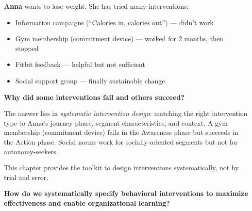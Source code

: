 \begin{tcolorbox}[colback=yellow!5!white, colframe=yellow!75!black,
    title=Intuition: Anna's Weight Loss Journey]

\textbf{Anna} wants to lose weight. She has tried many interventions:
\begin{itemize}[nosep]
\item Information campaigns (``Calories in, calories out'') --- didn't work
\item Gym membership (commitment device) --- worked for 2 months, then stopped
\item Fitbit feedback --- helpful but not sufficient
\item Social support group --- finally sustainable change
\end{itemize}

\textbf{Why did some interventions fail and others succeed?}

The answer lies in \textit{systematic intervention design}: matching the right intervention type to Anna's journey phase, segment characteristics, and context. A gym membership (commitment device) fails in the Awareness phase but succeeds in the Action phase. Social norms work for socially-oriented segments but not for autonomy-seekers.

This chapter provides the toolkit to design interventions systematically, not by trial and error.
\end{tcolorbox}


\begin{tcolorbox}[colback=red!5!white, colframe=red!75!black,
    title=Central Question]
\textbf{How do we systematically specify behavioral interventions to maximize effectiveness and enable organizational learning?}
\end{tcolorbox}

